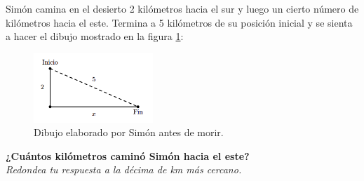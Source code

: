 Simón camina en el desierto 2 kilómetros hacia el sur y luego un cierto número de kilómetros hacia el este.
Termina a 5 kilómetros de su posición inicial y se sienta a hacer el dibujo mostrado en la figura \ref{fig:proverb_pitagoras_01}:
\begin{figure}[H]
    \begin{center}
        \includegraphics[width=0.4\textwidth]{../images/proverb_pitagoras_01.png}
    \end{center}
    \caption{Dibujo elaborado por Simón antes de morir.}
    \label{fig:proverb_pitagoras_01}
\end{figure}
\textbf{¿Cuántos kilómetros caminó Simón hacia el este?}\\
\textit{Redondea tu respuesta a la décima de km más cercano.}
